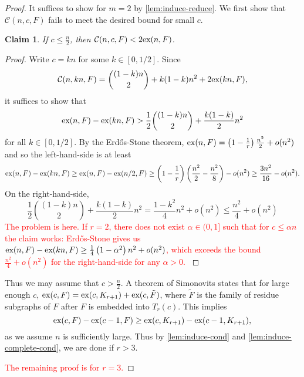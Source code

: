 \documentclass[12pt]{report}
\newtheorem{claim}{Claim}[theorem]
\newcommand*{\ex}{\textnormal{ex}}
\newcommand*{\con}{\mathcal{C}}
\begin{document}
\begin{proof}
  It suffices to show for $m = 2$ by \cref{lem:induce-reduce}. We first show that $\con(n, c, F)$ fails to meet the desired bound for small $c$.
  \begin{claim}
    If $c \leq \frac{n}{2}$, then $\con(n, c, F) < 2\ex(n, F)$.
  \end{claim}

  \begin{proof}
    Write $c = kn$ for some $k \in [0, 1/2]$. Since
    \[
      \con(n, kn, F) = \binom{(1 - k)n}{2} + k(1 - k)n^2 + 2\ex(kn, F),
    \]
    it suffices to show that
    \[
      \ex(n, F) - \ex(kn, F) > \frac{1}{2}\binom{(1 - k)n}{2} + \frac{k(1 - k)}{2}n^2
    \]
    for all $k \in [0, 1/2]$. By the Erdős-Stone theorem, $\ex(n, F) = \left(1 - \frac{1}{r}\right)\frac{n^2}{2} + o(n^2)$ and so the left-hand-side is at least
    \[
      \ex(n, F) - \ex(kn, F) \geq \ex(n, F) - \ex(n/2, F) \geq \left(1 - \frac{1}{r}\right)\left(\frac{n^2}{2} - \frac{n^2}{8}\right) - o(n^2) \geq \frac{3n^2}{16} - o(n^2).
    \]
    On the right-hand-side, 
    \[
      \frac{1}{2}\binom{(1 - k)n}{2} + \frac{k(1 - k)}{2}n^2 = \frac{1 - k^2}{4}n^2 + o(n^2) \leq \frac{n^2}{4} + o(n^2)
    \]
    \textcolor{red}{The problem is here. If $r = 2$, there does not exist $\alpha \in (0, 1]$ such that for $c \leq \alpha n$ the claim works: Erdős-Stone gives us $\ex(n, F) - \ex(kn, F) \geq \frac{1}{4}\left(1 - \alpha^2\right)n^2 + o(n^2)$, which exceeds the bound $\frac{n^2}{4} + o(n^2)$ for the right-hand-side for any $\alpha > 0$. }
  \end{proof}

  Thus we may assume that $c > \frac{n}{2}$. A theorem of Simonovits states that for large enough $c$, $\ex(c, F) = \ex(c, K_{r + 1}) + \ex(c, \tilde{F})$, where $\tilde{F}$ is the family of residue subgraphs of $F$ after $F$ is embedded into $T_r(c)$. This implies
  \[
    \ex(c, F) - \ex(c - 1, F) \geq \ex(c, K_{r + 1}) - \ex(c - 1, K_{r + 1}),
  \]
  as we assume $n$ is sufficiently large. Thus by \cref{lem:induce-cond} and \cref{lem:induce-complete-cond}, we are done if $r > 3$. 

  \textcolor{red}{The remaining proof is for $r = 3$.}
  

\end{proof}
\end{document}
